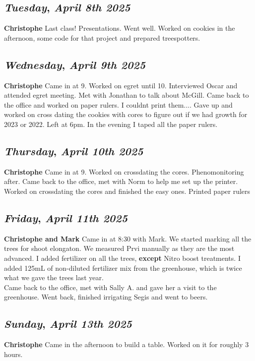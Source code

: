 \def\day{\textit{April 8th 2025}}
\def\weekday{\textit{Tuesday}}
\subsection*{\weekday, \day}
\textbf {Christophe}
Last class! Presentations. Went well. Worked on cookies in the afternoon, some code for that project and prepared treespotters. 

\def\day{\textit{April 9th 2025}}
\def\weekday{\textit{Wednesday}}
\subsection*{\weekday, \day}
\textbf {Christophe}
Came in at 9. Worked on egret until 10. Interviewed Oscar and attended egret meeting. Met with Jonathan to talk about McGill. Came back to the office and worked on paper rulers. I couldnt print them.... Gave up and worked on cross dating the cookies with cores to figure out if we had growth for 2023 or 2022. Left at 6pm. In the evening I taped all the paper rulers. 

\def\day{\textit{April 10th 2025}}
\def\weekday{\textit{Thursday}}
\subsection*{\weekday, \day}
\textbf {Christophe}
Came in at 9. Worked on crossdating the cores. Phenomonitoring after. Came back to the office, met with Norm to help me set up the printer. Worked on crossdating the cores and finished the easy ones. Printed paper rulers 
\def\day{\textit{April 11th 2025}}
\def\weekday{\textit{Friday}}
\subsection*{\weekday, \day}
\textbf {Christophe and Mark}
Came in at 8:30 with Mark. We started marking all the trees for shoot elongaton. We measured Prvi manually as they are the most advanced. I added fertilizer on all the trees, \textbf{except} Nitro boost treatments. I added 125mL of non-diluted fertilizer mix from the greenhouse, which is twice what we gave the trees last year.\\
Came back to the office, met with Sally A. and gave her a visit to the greenhouse. Went back, finished irrigating Segis and went to beers.

\def\day{\textit{April 13th 2025}}
\def\weekday{\textit{Sunday}}
\subsection*{\weekday, \day}
\textbf {Christophe}
Came in the afternoon to build a table. Worked on it for roughly 3 hours. 

